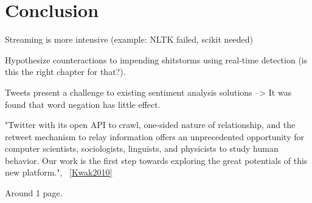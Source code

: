 \chapter{Conclusion}
\label{ch:conclusion}

Streaming is more intensive (example: NLTK failed, scikit needed)

Hypothesize counteractions to impending shitstorms using real-time detection (is this the right chapter for that?).

Tweets present a challenge to existing sentiment analysis solutions
--> It was found that word negation has little effect.

"Twitter with its open API to crawl, one-sided nature of relationship,
and the retweet mechanism to relay information offers an unprecedented
opportunity for computer scientists, sociologists, linguists,
and physicists to study human behavior. Our work is the first
step towards exploring the great potentials of this new platform.", ~\ref{Kwak2010}

Around 1 page.
\pagebreak[1]

